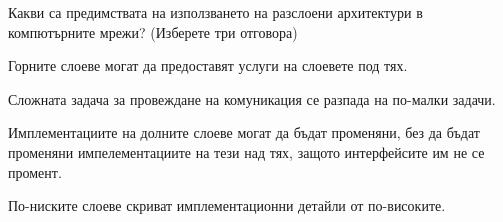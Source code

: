 \question[6] Какви са предимствата на използването на разслоени архитектури в
компютърните мрежи? (Изберете три отговора)

\begin{choices}
  \choice Горните слоеве могат да предоставят услуги на слоевете под тях.

  \CorrectChoice Сложната задача за провеждане на комуникация се разпада на
  по-малки задачи.

  \CorrectChoice Имплементациите на долните слоеве могат да бъдат променяни, без
  да бъдат променяни импелементациите на тези над тях, защото интерфейсите им не
  се промент.

  \CorrectChoice По-ниските слоеве скриват имплементационни детайли от
  по-високите.
\end{choices}